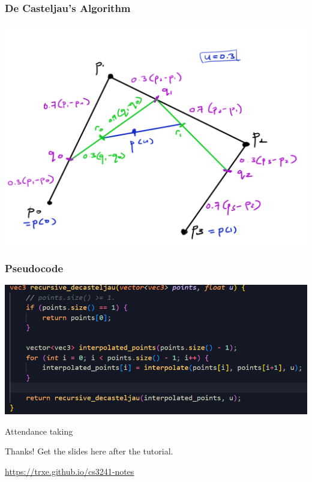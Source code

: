 \documentclass{beamer}
\begin{document}
\begin{frame}
    \frametitle{De Casteljau's Algorithm}

    \begin{center}
        \includegraphics[scale=0.4]{q9-decasteljau.png}
    \end{center}

\end{frame}

\begin{frame}
    \frametitle{Pseudocode}

    \begin{center}
        \includegraphics[scale=0.7]{q9-pseudocode.png}
    \end{center}

\end{frame}

\begin{frame}
    \AlegreyaExtraBold \LARGE
    Attendance taking
\end{frame}

\ThankYou
\begin{frame}
    Thanks! Get the slides here after the tutorial.\\
    \vspace{2em}
    \scalebox{3}{\faGithub}\par\bigskip
    \url{https://trxe.github.io/cs3241-notes}
\end{frame}
\end{document}
